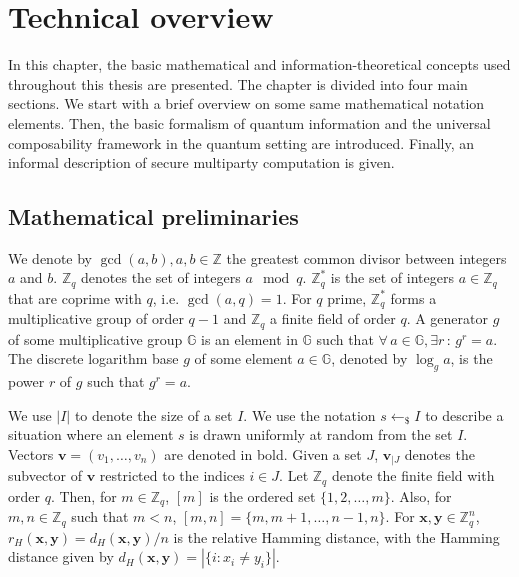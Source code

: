 


%

\chapter{Technical overview}

In this chapter, the basic mathematical and information-theoretical concepts used throughout this thesis are presented. The chapter is divided into four main sections. We start with a brief overview on some same mathematical notation elements. Then, the basic formalism of quantum information and the universal composability framework in the quantum setting are introduced. Finally, an informal description of secure multiparty computation is given.

\section{Mathematical preliminaries}

We denote by $\gcd (a,b), a,b\in\mathbb{Z}$ the greatest common divisor between integers $a$ and $b$. $\mathbb{Z}_q$ denotes the set of integers $a \mod q$. $\mathbb{Z}^*_q$ is the set of integers $a\in\mathbb{Z}_q$ that are coprime with $q$, i.e. $\gcd (a,q) = 1$. For $q$ prime, $\mathbb{Z}^*_q$ forms a multiplicative group of order $q-1$ and $\mathbb{Z}_q$ a finite field of order $q$. A generator $g$ of some multiplicative group $\mathbb{G}$ is an element in $\mathbb{G}$ such that $\forall\,a\in\mathbb{G}, \exists r\, :\, g^r = a$. The discrete logarithm base $g$ of some element $a\in\mathbb{G}$, denoted by $\log_g a$, is the power $r$ of $g$ such that $g^r = a$. 

We use $|I|$ to denote the size of a set $I$. We use the notation $s\leftarrow_{\$}I$ to describe a situation where an element $s$ is drawn uniformly at random from the set $I$. Vectors $\bm{v}= (v_1, \ldots , v_n)$  are denoted in bold. Given a set $J$, $\bm{v}_{|J}$ denotes the subvector of $\bm{v}$ restricted to the indices $i \in J$. Let $\mathbb{Z}_q$ denote the finite field with order $q$. Then, for $m\in \mathbb{Z}_q$, $[m]$ is the ordered set $\{1, 2, \ldots, m\}$. Also, for $m, n\in \mathbb{Z}_q$ such that $m<n$, $[m, n] = \{m, m+1, \dots, n-1, n\}$. For $\bm{x},\bm{y}\in\mathbb{Z}^n_q$, $r_H(\bm{x}, \bm{y})=d_H(\bm{x}, \bm{y})/n$ is the relative Hamming distance, with the Hamming distance given by $d_H(\bm{x}, \bm{y}) = |\{ i : x_i \neq y_i \}|$.

